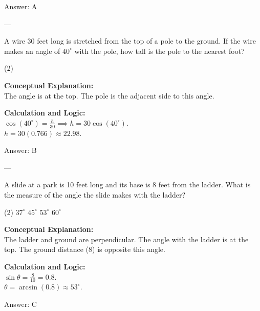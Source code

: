 \documentclass[11pt,paper=a4,answers]{exam}
\begin{document}
\begin{questions}
\begin{solution}
\vspace{15pt}
Answer: \colorbox{yellow!100}{A}
\end{solution}

---

\question
A wire 30 feet long is stretched from the top of a pole to the ground. If the wire makes an angle of $40^\circ$ with the pole, how tall is the pole to the nearest foot?
\begin{tasks}(2)
\end{tasks}

\begin{solution}
\textbf{Conceptual Explanation:} \\
The angle is at the top. The pole is the adjacent side to this angle.

\vspace{10pt}
\textbf{Calculation and Logic:} \\
$\cos(40^\circ) = \frac{h}{30} \implies h = 30 \cos(40^\circ)$. \\
$h = 30(0.766) \approx 22.98$.

\vspace{15pt}
Answer: \colorbox{yellow!100}{B}
\end{solution}

---

\question
A slide at a park is 10 feet long and its base is 8 feet from the ladder. What is the measure of the angle the slide makes with the ladder?
\begin{tasks}(2)
    \task $37^\circ$
    \task $45^\circ$
    \task $53^\circ$
    \task $60^\circ$
\end{tasks}

\begin{solution}
\textbf{Conceptual Explanation:} \\
The ladder and ground are perpendicular. The angle with the ladder is at the top. The ground distance (8) is opposite this angle.

\vspace{10pt}
\textbf{Calculation and Logic:} \\
$\sin \theta = \frac{8}{10} = 0.8$. \\
$\theta = \arcsin(0.8) \approx 53^\circ$.

\vspace{15pt}
Answer: \colorbox{yellow!100}{C}
\end{solution}


\end{questions}
\end{document}
